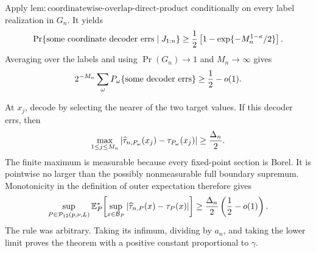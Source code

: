 Apply \(\mathrm{lem:coordinatewise\text{-}overlap\text{-}direct\text{-}product}\) conditionally on every label realization in \(G_n\).  It yields
\[
 \Pr\{\text{some coordinate decoder errs}\mid J_{1:n}\}
 \geq {1\over2}\left[1-\exp\{-M_n^{1-\kappa}/2\}\right].
\]
Averaging over the labels and using \(\Pr(G_n)\to1\) and \(M_n\to\infty\) gives
\[
 2^{-M_n}\sum_\omega P_\omega\{\text{some decoder errs}\}\geq {1\over2}-o(1).
\]

At \(x_j\), decode by selecting the nearer of the two target values.  If this decoder errs, then
\[
 \max_{1\leq j\leq M_n}|\widehat\tau_{n,P_\omega}(x_j)-\tau_{P_\omega}(x_j)|\geq{\Delta_n\over2}.
\]
The finite maximum is measurable because every fixed-point section is Borel.  It is pointwise no larger than the possibly nonmeasurable full boundary supremum.  Monotonicity in the definition of outer expectation therefore gives
\[
 \sup_{P\in\mathcal P_{12}(p,\nu,L)}
 \mathbb E_P^*\!\left[\sup_{x\in\mathcal B_P}|\widehat\tau_{n,P}(x)-\tau_P(x)|\right]
 \geq {\Delta_n\over2}\left({1\over2}-o(1)\right).
\]
The rule was arbitrary.  Taking its infimum, dividing by \(a_n\), and taking the lower limit proves the theorem with a positive constant proportional to \(\gamma\).